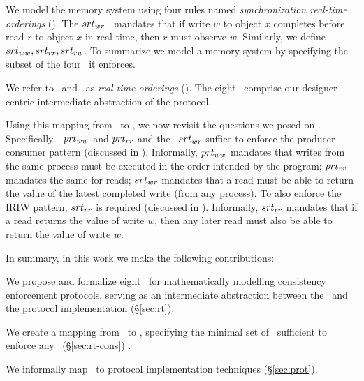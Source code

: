 We model the memory system using four rules named \emph{synchronization real-time orderings} (\emph{\srts}).
The $srt_{wr}$ \srt\ mandates that if write $w$ to object $x$ completes before read $r$ to object $x$ in real time, then $r$ must observe $w$.
Similarly, we define $srt_{ww}, srt_{rr}, srt_{rw}$.
To summarize we model a memory system by specifying the subset of the four \srts\ it enforces.

We refer to \prts\ and \srts\ as \emph{real-time orderings} (\emph{\rts}).
The eight \rts\ comprise our designer-centric intermediate abstraction of the protocol. 


Using this mapping from \mcms\ to \rts, we now revisit the questions we posed on . Specifically, \prts\ $prt_{ww}$ and $prt_{rr}$ and the \srt\ $srt_{wr}$ suffice to enforce the producer-consumer pattern (discussed in ). 
Informally, $prt_{ww}$ mandates that writes from the same process must be executed in the order intended by the program; $prt_{rr}$ mandates the same for reads; $srt_{wr}$ mandates that a read must be able to return the value of the latest completed write (from any process).
To also enforce the IRIW pattern, $srt_{rr}$ is required (discussed in ). Informally, $srt_{rr}$ mandates that if a read returns the value of write $w$, then any later read must also be able to return the value of write $w$.

In summary, in this work we make the following contributions:
\squishlistContrib
\item 
We propose and formalize eight \rts\ for mathematically modelling consistency enforcement protocols, serving as an intermediate abstraction between the \mcm\ and the protocol implementation (\S\ref{sec:rt}).
\item
We create a mapping from \mcms\ to \rts, specifying the minimal set of \rts\ sufficient to enforce any \mcm\ (\S\ref{sec:rt-cons}) . 
\item
We informally map \rts\ to protocol implementation techniques (\S\ref{sec:prot}).
\squishend

























